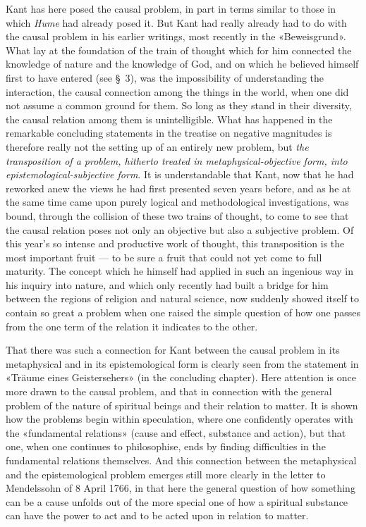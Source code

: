 \documentclass[12pt,a4paper]{article}
\newcommand{\opage}[1]{\marginnote{\footnotesize\textit{[#1]}}}
\begin{document}
Kant has here posed the causal problem, in part in terms similar to those
in which \emph{Hume} had already posed it. But Kant had really already had to do
with the causal problem in his earlier writings, most recently in the
«Beweisgrund». What lay at the foundation of the train of thought which
for him connected the knowledge of nature and the knowledge of God, and on
which he believed himself first to have entered (see §\ 3), was the
impossibility of understanding the interaction, the causal connection
among the things in the world, when one did not assume a common ground for
them. So long as they stand in their diversity, the causal relation among
them is unintelligible. What has happened in the remarkable concluding
statements in the treatise on negative magnitudes is therefore really not
the setting up of an entirely new problem, but \emph{the transposition of a
problem, hitherto treated in metaphysical-objective form, into
epistemological-subjective form}. It is understandable that Kant,
now that he had reworked anew the views he had first presented seven years
before, and as he at the same time came upon purely logical and
methodological investigations, was bound, through the collision of these
two trains of thought, to come to see that the causal relation poses not
only an objective but also a subjective problem. Of this year's so intense
and productive work of thought, this transposition is the most important
fruit --- to be sure a fruit that could not yet come to full maturity. The
concept which he himself had applied in such an ingenious way in his
inquiry into nature, and which only recently had built a bridge for him
between the regions of religion and natural science, now suddenly showed
itself to contain so great a problem when one raised the simple question
of how one passes from the one term of the relation it indicates to the
other.

That there was such a connection for Kant between the causal problem in
its metaphysical and in its epistemological form is clearly seen from the
statement in «Träume eines \opage{21}Geistersehers» (in the concluding chapter).
Here attention is once more drawn to the causal problem, and that in
connection with the general problem of the nature of spiritual beings and
their relation to matter. It is shown how the problems begin within
speculation, where one confidently operates with the «fundamental
relations» (cause and effect, substance and action), but that one, when
one continues to philosophise, ends by finding difficulties in the
fundamental relations themselves. And this connection between the
metaphysical and the epistemological problem emerges still more clearly in
the letter to Mendelssohn of 8 April 1766, in that here the general
question of how something can be a cause unfolds out of the more special
one of how a spiritual substance can have the power to act and to be acted
upon in relation to matter.
\end{document}

